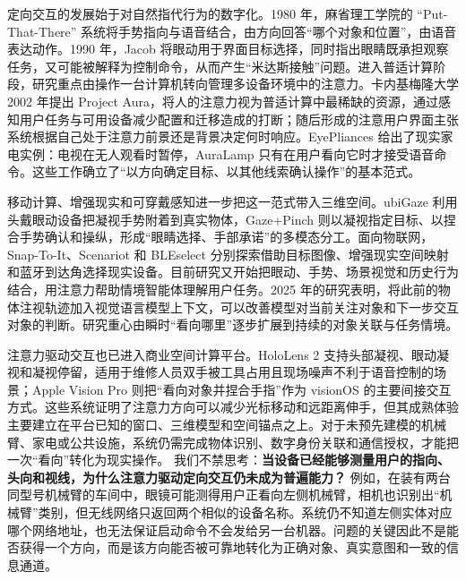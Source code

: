 定向交互的发展始于对自然指代行为的数字化。1980 年，麻省理工学院的 ``Put-That-There'' 系统将手势指向与语音结合，由方向回答“哪个对象和位置”，由语音表达动作\supercite{bolt_put_that_there}。1990 年，Jacob 将眼动用于界面目标选择，同时指出眼睛既承担观察任务，又可能被解释为控制命令，从而产生“米达斯接触”问题\supercite{jacobgaze}。进入普适计算阶段，研究重点由操作一台计算机转向管理多设备环境中的注意力。卡内基梅隆大学 2002 年提出 Project Aura，将人的注意力视为普适计算中最稀缺的资源，通过感知用户任务与可用设备减少配置和迁移造成的打断\supercite{project_aura}；随后形成的注意用户界面主张系统根据自己处于注意力前景还是背景决定何时响应\supercite{attentive_user_interfaces}。EyePliances 给出了现实家电实例：电视在无人观看时暂停，AuraLamp 只有在用户看向它时才接受语音命令\supercite{eyepliances}。这些工作确立了“以方向确定目标、以其他线索确认操作”的基本范式。

移动计算、增强现实和可穿戴感知进一步把这一范式带入三维空间。ubiGaze 利用头戴眼动设备把凝视手势附着到真实物体\supercite{ubigaze}，Gaze+Pinch 则以凝视指定目标、以捏合手势确认和操纵，形成“眼睛选择、手部承诺”的多模态分工\supercite{gaze_pinch}。面向物联网，Snap-To-It、Scenariot 和 BLEselect 分别探索借助目标图像、增强现实空间映射和蓝牙到达角选择现实设备\supercite{snaptoit,scenariot,bleselect}。目前研究又开始把眼动、手势、场景视觉和历史行为结合，用注意力帮助情境智能体理解用户任务。2025 年的研究表明，将此前的物体注视轨迹加入视觉语言模型上下文，可以改善模型对当前关注对象和下一步交互对象的判断\supercite{gaze_contextual_ai}。研究重心由瞬时“看向哪里”逐步扩展到持续的对象关联与任务情境。

注意力驱动交互也已进入商业空间计算平台。HoloLens 2 支持头部凝视、眼动凝视和凝视停留，适用于维修人员双手被工具占用且现场噪声不利于语音控制的场景\supercite{hololens_gaze_dwell}；Apple Vision Pro 则把“看向对象并捏合手指”作为 visionOS 的主要间接交互方式\supercite{visionos_interaction}。这些系统证明了注意力方向可以减少光标移动和远距离伸手，但其成熟体验主要建立在平台已知的窗口、三维模型和空间锚点之上。对于未预先建模的机械臂、家电或公共设施，系统仍需完成物体识别、数字身份关联和通信授权，才能把一次“看向”转化为现实操作。
我们不禁思考：\textbf{当设备已经能够测量用户的指向、头向和视线，为什么注意力驱动定向交互仍未成为普遍能力？} 例如，在装有两台同型号机械臂的车间中，眼镜可能测得用户正看向左侧机械臂，相机也识别出“机械臂”类别，但无线网络只返回两个相似的设备名称。系统仍不知道左侧实体对应哪个网络地址，也无法保证启动命令不会发给另一台机器。问题的关键因此不是能否获得一个方向，而是该方向能否被可靠地转化为正确对象、真实意图和一致的信息通道。

